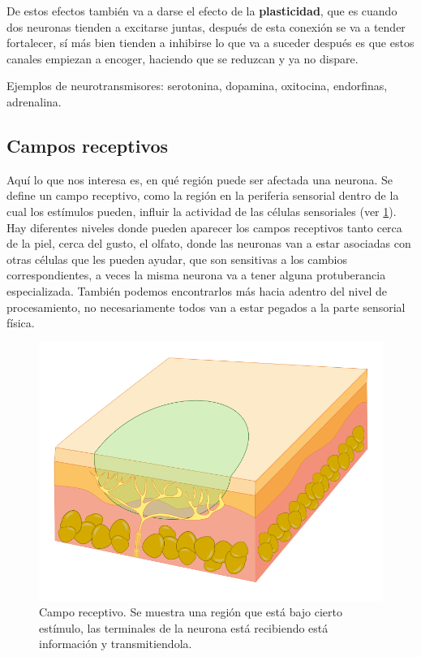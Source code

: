 De estos efectos también va a darse el efecto de la \textbf{plasticidad}, que es cuando dos neuronas tienden a excitarse juntas, después de esta conexión se va a tender fortalecer, sí más bien tienden a inhibirse lo que va a suceder después es que estos canales empiezan a encoger, haciendo que se reduzcan y ya no dispare.

Ejemplos de neurotransmisores: serotonina, dopamina, oxitocina, endorfinas, adrenalina.


\subsection{Campos receptivos}
Aquí lo que nos interesa es, en qué región puede ser afectada una neurona. Se define un campo receptivo, como la región en la periferia sensorial
dentro de la cual los estímulos pueden, influir la actividad de las células sensoriales (ver \ref{fig:camposR}). Hay diferentes niveles donde pueden aparecer los campos receptivos tanto cerca de la piel, cerca del gusto, el olfato, donde las neuronas van a estar asociadas con otras células que les pueden ayudar, que son sensitivas a los cambios correspondientes, a veces la misma neurona va a tener alguna protuberancia especializada.
También podemos encontrarlos más hacia adentro del nivel de procesamiento, no necesariamente todos van a estar pegados a la parte sensorial física. 
\begin{figure}[h]
 \centering
 \includegraphics[scale=0.3]{../Figuras/camposreceptores.png}
 \caption{Campo receptivo. Se muestra una región que está bajo cierto estímulo, las terminales de la neurona está recibiendo está información y transmitiendola.}
 \label{fig:camposR}
\end{figure}

